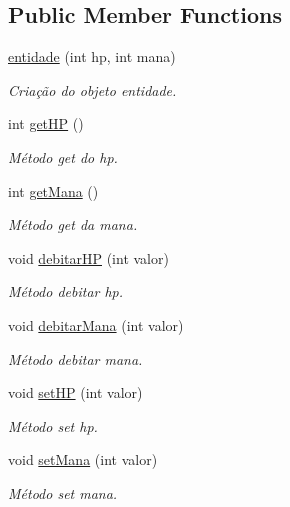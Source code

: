 \subsection*{Public Member Functions}
\begin{DoxyCompactItemize}
\item 
\mbox{\hyperlink{classentidade_a1ae08f868dbdfaa1e85a6799b074d769}{entidade}} (int hp, int mana)
\begin{DoxyCompactList}\small\item\em Criação do objeto entidade. \end{DoxyCompactList}\item 
int \mbox{\hyperlink{classentidade_a1cbf074af4a67d31091265e677502b8e}{get\+HP}} ()
\begin{DoxyCompactList}\small\item\em Método get do hp. \end{DoxyCompactList}\item 
int \mbox{\hyperlink{classentidade_a0fa69d3b04a023da3d474e18619d27f7}{get\+Mana}} ()
\begin{DoxyCompactList}\small\item\em Método get da mana. \end{DoxyCompactList}\item 
void \mbox{\hyperlink{classentidade_abbd3175dda4fa70fd2ef4c7bf8dd6c2e}{debitar\+HP}} (int valor)
\begin{DoxyCompactList}\small\item\em Método debitar hp. \end{DoxyCompactList}\item 
void \mbox{\hyperlink{classentidade_a16d5689ead06cec1a6ad52dde8989e96}{debitar\+Mana}} (int valor)
\begin{DoxyCompactList}\small\item\em Método debitar mana. \end{DoxyCompactList}\item 
void \mbox{\hyperlink{classentidade_ae30252d3e3b769a7b56d994552bb2856}{set\+HP}} (int valor)
\begin{DoxyCompactList}\small\item\em Método set hp. \end{DoxyCompactList}\item 
void \mbox{\hyperlink{classentidade_acc3d424b1cdad2cc19c03cc0bff4cce6}{set\+Mana}} (int valor)
\begin{DoxyCompactList}\small\item\em Método set mana. \end{DoxyCompactList}\end{DoxyCompactItemize}


